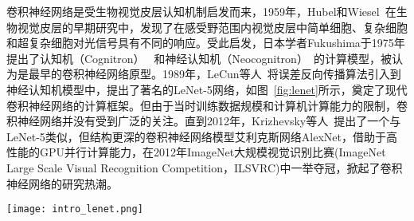 卷积神经网络是受生物视觉皮层认知机制启发而来，1959年，Hubel和Wiesel~\cite{hubel1959receptive,hubel1962receptive}在生物视觉皮层的早期研究中，发现了在感受野范围内视觉皮层中简单细胞、复杂细胞和超复杂细胞对光信号具有不同的响应。受此启发，日本学者Fukushima于1975年提出了认知机（Cognitron）~\cite{fukushima1975cognitron} 和神经认知机（Neocognitron）~\cite{fukushima1980neocognitron}的计算模型，被认为是最早的卷积神经网络原型。1989年，LeCun等人~\cite{lecun1989backpropagation,le1990handwritten}将误差反向传播算法引入到神经认知机模型中，提出了著名的LeNet-5网络，如图~\ref{fig:lenet}所示，奠定了现代卷积神经网络的计算框架。但由于当时训练数据规模和计算机计算能力的限制，卷积神经网络并没有受到广泛的关注。直到2012年，Krizhevsky等人~\cite{krizhevsky2012imagenet}提出了一个与LeNet-5类似，但结构更深的卷积神经网络模型艾利克斯网络AlexNet，借助于高性能的GPU并行计算能力，在2012年ImageNet大规模视觉识别比赛(ImageNet Large Scale Visual Recognition Competition，ILSVRC)中一举夺冠，掀起了卷积神经网络的研究热潮。

\begin{figure*}
\centering
\texttt{[image: intro\_lenet.png]}
\caption{LeNet-5~\cite{lecun1989backpropagation}网络结构。}
\label{fig:lenet}
\end{figure*}




